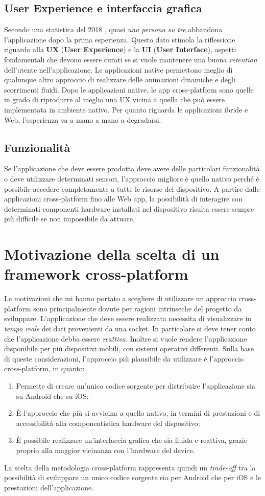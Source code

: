 \subsection{User Experience e interfaccia grafica}
Secondo una statistica del 2018 \cite{tasso_di_abbandono_app}, quasi \textit{una persona su tre} abbandona l'applicazione dopo la prima esperienza. Questo dato stimola la riflessione riguardo alla \textbf{UX} (\textbf{User Experience}) e la \textbf{UI} (\textbf{User Interface}), aspetti fondamentali che devono essere curati se si vuole mantenere una buona \textit{retention} dell'utente nell'applicazione. Le applicazioni native permettono meglio di qualunque altro approccio di realizzare delle animazioni dinamiche e degli scorrimenti fluidi. Dopo le applicazioni native, le app cross-platform sono quelle in grado di riprodurre al meglio una UX vicina a quella che può essere implementata in ambiente nativo. Per quanto riguarda le applicazioni ibride e Web, l'esperienza va a mano a mano a degradarsi.

\subsection{Funzionalità}
Se l'applicazione che deve essere prodotta deve avere delle particolari funzionalità o deve utilizzare determinati sensori, l'approccio migliore è quello nativo perché è possibile accedere completamente a tutte le risorse del dispositivo. A partire dalle applicazioni cross-platform fino alle Web app, la possibilità di interagire con determinati componenti hardware installati nel dispositivo risulta essere sempre più difficile se non impossibile da attuare.

\section{Motivazione della scelta di un framework cross-platform}
Le motivazioni che mi hanno portato a scegliere di utilizzare un approccio cross-platform sono principalmente dovute per ragioni intrinseche del progetto da sviluppare. L'applicazione che deve essere realizzata necessita di visualizzare in \textit{tempo reale} dei dati provenienti da una socket. In particolare si deve tener conto che l'applicazione debba essere \textit{reattiva}. Inoltre si vuole rendere l'applicazione disponibile per più dispositivi mobili, con sistemi operativi differenti. Sulla base di queste considerazioni, l'approccio più plausibile da utilizzare è l'approccio cross-platform, in quanto:
\begin{enumerate}
	\item Permette di creare un'unico codice sorgente per distribuire l'applicazione sia su Android che su iOS;
	\item È l'approccio che più si avvicina a quello nativo, in termini di prestazioni e di accessibilità alla componentistica hardware del dispositivo;
	\item È possibile realizzare un'interfaccia grafica che sia fluida e reattiva, grazie proprio alla maggior vicinanza con l'hardware del device.
\end{enumerate}

La scelta della metodologia cross-platform rappresenta quindi un \textit{trade-off} tra la possibilità di sviluppare un unico codice sorgente sia per Android che per iOS e le prestazioni dell'applicazione.